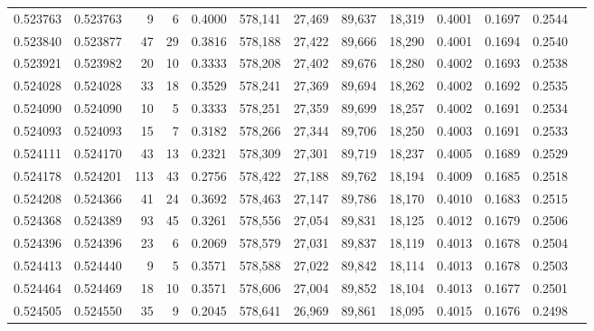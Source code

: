 \begin{tabular}{rrrrrrrrrrrrr}
0.523763 & 0.523763 &     9 &     6 &                                     0.4000 & 578,141 &  27,469 &  89,637 &  18,319 & 0.4001 & 0.1697 & 0.2544 \\
0.523840 & 0.523877 &    47 &    29 &                                     0.3816 & 578,188 &  27,422 &  89,666 &  18,290 & 0.4001 & 0.1694 & 0.2540 \\
0.523921 & 0.523982 &    20 &    10 &                                     0.3333 & 578,208 &  27,402 &  89,676 &  18,280 & 0.4002 & 0.1693 & 0.2538 \\
0.524028 & 0.524028 &    33 &    18 &                                     0.3529 & 578,241 &  27,369 &  89,694 &  18,262 & 0.4002 & 0.1692 & 0.2535 \\
0.524090 & 0.524090 &    10 &     5 &                                     0.3333 & 578,251 &  27,359 &  89,699 &  18,257 & 0.4002 & 0.1691 & 0.2534 \\
0.524093 & 0.524093 &    15 &     7 &                                     0.3182 & 578,266 &  27,344 &  89,706 &  18,250 & 0.4003 & 0.1691 & 0.2533 \\
0.524111 & 0.524170 &    43 &    13 &                                     0.2321 & 578,309 &  27,301 &  89,719 &  18,237 & 0.4005 & 0.1689 & 0.2529 \\
0.524178 & 0.524201 &   113 &    43 &                                     0.2756 & 578,422 &  27,188 &  89,762 &  18,194 & 0.4009 & 0.1685 & 0.2518 \\
0.524208 & 0.524366 &    41 &    24 &                                     0.3692 & 578,463 &  27,147 &  89,786 &  18,170 & 0.4010 & 0.1683 & 0.2515 \\
0.524368 & 0.524389 &    93 &    45 &                                     0.3261 & 578,556 &  27,054 &  89,831 &  18,125 & 0.4012 & 0.1679 & 0.2506 \\
0.524396 & 0.524396 &    23 &     6 &                                     0.2069 & 578,579 &  27,031 &  89,837 &  18,119 & 0.4013 & 0.1678 & 0.2504 \\
0.524413 & 0.524440 &     9 &     5 &                                     0.3571 & 578,588 &  27,022 &  89,842 &  18,114 & 0.4013 & 0.1678 & 0.2503 \\
0.524464 & 0.524469 &    18 &    10 &                                     0.3571 & 578,606 &  27,004 &  89,852 &  18,104 & 0.4013 & 0.1677 & 0.2501 \\
0.524505 & 0.524550 &    35 &     9 &                                     0.2045 & 578,641 &  26,969 &  89,861 &  18,095 & 0.4015 & 0.1676 & 0.2498 \\

\end{tabular}

